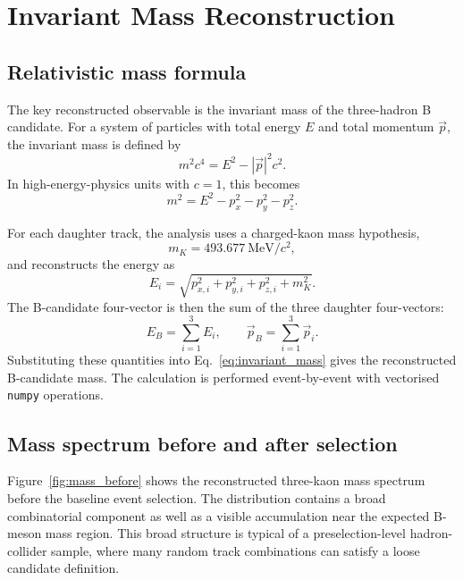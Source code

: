 \section{Invariant Mass Reconstruction}

\subsection{Relativistic mass formula}

The key reconstructed observable is the invariant mass of the three-hadron B candidate. For a system of particles with total energy $E$ and total momentum $\vec{p}$, the invariant mass is defined by
\begin{equation}
  m^2 c^4 = E^2 - |\vec{p}|^2 c^2 .
\end{equation}
In high-energy-physics units with $c=1$, this becomes
\begin{equation}
  m^2 = E^2 - p_x^2 - p_y^2 - p_z^2 .
  \label{eq:invariant_mass}
\end{equation}

For each daughter track, the analysis uses a charged-kaon mass hypothesis,
\begin{equation}
  m_K = \SI{493.677}{\mega\electronvolt}/c^2 ,
\end{equation}
and reconstructs the energy as
\begin{equation}
  E_i = \sqrt{p_{x,i}^2 + p_{y,i}^2 + p_{z,i}^2 + m_K^2}.
\end{equation}
The B-candidate four-vector is then the sum of the three daughter four-vectors:
\begin{equation}
  E_B = \sum_{i=1}^{3} E_i, \qquad
  \vec{p}_B = \sum_{i=1}^{3} \vec{p}_i .
\end{equation}
Substituting these quantities into Eq.~\ref{eq:invariant_mass} gives the reconstructed B-candidate mass. The calculation is performed event-by-event with vectorised \texttt{numpy} operations.

\subsection{Mass spectrum before and after selection}

Figure~\ref{fig:mass_before} shows the reconstructed three-kaon mass spectrum before the baseline event selection. The distribution contains a broad combinatorial component as well as a visible accumulation near the expected B-meson mass region. This broad structure is typical of a preselection-level hadron-collider sample, where many random track combinations can satisfy a loose candidate definition.

